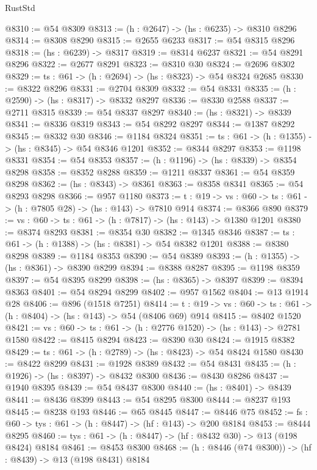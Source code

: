 \begin{lexlean}{RustStd}
\begin{coremodule}
@8310 := @54 @8309
@8313 := (h : @2647) -> (hs : @6235) -> @8310 @8296
@8314 := @8308 @8290
@8315 := @2655 @6233
@8317 := @54 @8315 @8296
@8318 := (hs : @6239) -> @8317
@8319 := @8314 @6237
@8321 := @54 @8291 @8296
@8322 := @2677 @8291
@8323 := @8310 @30
@8324 := @2696 @8302
@8329 := {ts : @61} -> (h : @2694) -> (hs : @8323) -> @54 @8324 @2685
@8330 := @8322 @8296
@8331 := @2704 @8309
@8332 := @54 @8331
@8335 := (h : @2590) -> (hs : @8317) -> @8332 @8297
@8336 := @8330 @2588
@8337 := @2711 @8315
@8339 := @54 @8337 @8297
@8340 := (hs : @8321) -> @8339
@8341 := @8336 @8319
@8343 := @54 @8292 @8297
@8344 := @1387 @8292
@8345 := @8332 @30
@8346 := @1184 @8324
@8351 := {ts : @61} -> (h : @1355) -> (hs : @8345) -> @54 @8346 @1201
@8352 := @8344 @8297
@8353 := @1198 @8331
@8354 := @54 @8353
@8357 := (h : @1196) -> (hs : @8339) -> @8354 @8298
@8358 := @8352 @8288
@8359 := @1211 @8337
@8361 := @54 @8359 @8298
@8362 := (hs : @8343) -> @8361
@8363 := @8358 @8341
@8365 := @54 @8293 @8298
@8366 := @957 @1180
@8373 := {t : @19} -> {vs : @60} -> {ts : @61} -> (h : @7805 @28) -> (hs : @143) -> @7810 @914
@8374 := @8366 @890
@8379 := {vs : @60} -> {ts : @61} -> (h : @7817) -> (hs : @143) -> @1380 @1201
@8380 := @8374 @8293
@8381 := @8354 @30
@8382 := @1345 @8346
@8387 := {ts : @61} -> (h : @1388) -> (hs : @8381) -> @54 @8382 @1201
@8388 := @8380 @8298
@8389 := @1184 @8353
@8390 := @54 @8389
@8393 := (h : @1355) -> (hs : @8361) -> @8390 @8299
@8394 := @8388 @8287
@8395 := @1198 @8359
@8397 := @54 @8395 @8299
@8398 := (hs : @8365) -> @8397
@8399 := @8394 @8363
@8401 := @54 @8294 @8299
@8402 := @957 @1562
@8404 := @13 @1914 @28
@8406 := @896 (@1518 @7251)
@8414 := {t : @19} -> {vs : @60} -> {ts : @61} -> (h : @8404) -> (hs : @143) -> @54 (@8406 @69) @914
@8415 := @8402 @1520
@8421 := {vs : @60} -> {ts : @61} -> (h : @2776 @1520) -> (hs : @143) -> @2781 @1580
@8422 := @8415 @8294
@8423 := @8390 @30
@8424 := @1915 @8382
@8429 := {ts : @61} -> (h : @2789) -> (hs : @8423) -> @54 @8424 @1580
@8430 := @8422 @8299
@8431 := @1928 @8389
@8432 := @54 @8431
@8435 := (h : @1926) -> (hs : @8397) -> @8432 @8300
@8436 := @8430 @8286
@8437 := @1940 @8395
@8439 := @54 @8437 @8300
@8440 := (hs : @8401) -> @8439
@8441 := @8436 @8399
@8443 := @54 @8295 @8300
@8444 := @8237 @193
@8445 := @8238 @193
@8446 := @65 @8445
@8447 := @8446 @75
@8452 := {fs : @60} -> {tys : @61} -> (h : @8447) -> (hf : @143) -> @200 @8184
@8453 := @8444 @8295
@8460 := {tys : @61} -> (h : @8447) -> (hf : @8432 @30) -> @13 (@198 @8424) @8184
@8461 := @8453 @8300
@8468 := (h : @8446 (@74 @8300)) -> (hf : @8439) -> @13 (@198 @8431) @8184

\end{coremodule}
\end{lexlean}
